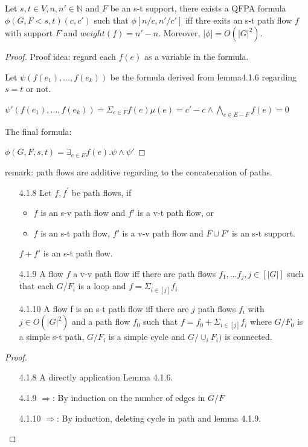 \documentclass{beamer}
\begin{document}
\begin{frame}
\begin{lemma}[4.1.7]
Let $s,t \in V, n,n'\in\mathbb{N}$ and $F$ be an s-t support, there exists a QFPA formula $\phi(G,F<s,t)(c,c')$ such that $\phi[n/c, n'/c']$ iff thre exits an s-t path flow $f$ with support $F$ and $weight(f) = n'-n$. Moreover, $|\phi| = O(|G|^2)$.


\end{lemma}

\begin{proof}
Proof idea: regard each $f(e)$ as a variable in the formula. 

Let $\psi(f(e_1), \ldots, f(e_k))$ be the formula derived from lemma4.1.6 regarding $s=t$ or not.

$\psi'(f(e_1), \ldots, f(e_k)) = \Sigma_{e\in F}f(e)\mu(e) = c' - c \wedge \bigwedge_{e\in E-F} f(e) = 0$

The final formula:

$\phi(G,F,s,t) = \exists_{e\in E}f(e).\psi\wedge \psi'$


\end{proof}

remark: path flows are additive regarding to the concatenation of paths.
\end{frame}


\begin{frame}
\begin{lemma}[4.1.8 \& 4.1.9 \& 4.1.10]
\begin{enumerate}
\item [4.1.8] Let $f, f^\prime$ be path flows, if
\begin{itemize}
\item $f$ is an s-v path flow and $f'$ is a v-t path flow, or
\item $f$ is an s-t path flow, $f'$ is a v-v path flow and $F\cup F'$ is an s-t support.
\end{itemize}


$f+f'$ is an s-t path flow.
\item [4.1.9]A flow $f$ a v-v path flow iff there are path flows $f_1, \ldots f_j, j\in [|G|]$ such that each $G/F_i$ is a loop and $f = \Sigma_{i\in[j]} f_i$


\item [4.1.10] A flow f is an s-t path flow iff there are $j$ path flows $f_i$ with $j\in O(|G|^2)$ and a path flow $f_0$ such that $f=f_0+\Sigma_{i\in [j]} f_i$ where $G/F_0$ is a simple s-t path, $G/F_i$ is a simple cycle and $G/\cup_i F_i)$ is connected.
\end{enumerate}
\end{lemma}
\begin{proof}
\begin{itemize}
\item[4.1.8] A directly application Lemma 4.1.6.
\item[4.1.9] $\Rightarrow$: By induction on the number of edges in $G/F$
\item [4.1.10] $\Rightarrow$: By induction, deleting cycle in path and lemma 4.1.9.
\end{itemize}

\end{proof}
\end{frame}
\end{document}
